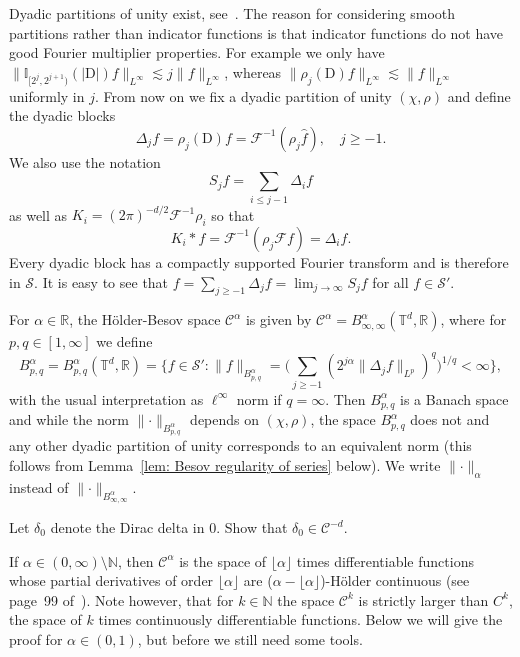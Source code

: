 \documentclass[a4paper,11pt]{article}
\newcommand{\cdummy}{\cdot}
\newcommand{\mathD}{\mathrm{D}}
\newcommand{\CF}{\mathscr{F}}
\newcommand{\CS}{\mathscr{S}}
\newcommand{\CC}{\mathscr{C}}
\begin{document}
Dyadic partitions of unity exist, see~{\cite{Bahouri2011}}. The reason for
considering smooth partitions rather than indicator functions is that
indicator functions do not have good Fourier multiplier properties. For
example we only have $\| \mathbb{I}_{[2^j, 2^{j + 1})} (| \mathD |) f
\|_{L^{\infty}} \lesssim j \| f \|_{L^{\infty}}$, whereas $\| \rho_j (\mathD)
f \|_{L^{\infty}} \lesssim \| f \|_{L^{\infty}}$ uniformly in $j$. From now on
we fix a dyadic partition of unity $(\chi, \rho)$ and define the dyadic blocks
\[ \Delta_j f = \rho_j (\mathD) f = \CF^{- 1} (\rho_j \hat{f}), \hspace{1em}
   j \geqslant - 1. \]
We also use the notation
\[ S_j f = \sum_{i \leqslant j - 1} \Delta_i f \]
as well as $K_i = (2 \pi)^{- d / 2} \CF^{- 1} \rho_i$ so that
\[ K_i \ast f = \CF^{- 1} \left( \rho_j \CF f \right) = \Delta_i f. \]
Every dyadic block has a compactly supported Fourier transform and is
therefore in $\CS$. It is easy to see that $f = \sum_{j \geqslant - 1}
\Delta_j f = \lim_{j \rightarrow \infty} S_j f$ for all $f \in \CS'$.

For $\alpha \in \mathbb{R}$, the H{\"o}lder-Besov space $\CC^{\alpha}$ is
given by $\CC^{\alpha} = B^{\alpha}_{\infty, \infty} (\mathbb{T}^d,
\mathbb{R})$, where for $p, q \in [1, \infty]$ we define
\[
    B^{\alpha}_{p, q} = B^{\alpha}_{p, q} (\mathbb{T}^d, \mathbb{R}) = \Big\{ f \in \CS' : \|f\|_{B^{\alpha}_{p, q}} = \Big( \sum_{j \geqslant - 1} (2^{j \alpha} \| \Delta_j f\|_{L^p})^q \Big)^{1 / q} < \infty \Big\},
\]
with the usual interpretation as $\ell^{\infty}$ norm if $q = \infty$. Then
$B^{\alpha}_{p, q}$ is a Banach space and while the norm $\lVert \cdummy
\rVert_{B^{\alpha}_{p, q}}$ depends on $(\chi, \rho)$, the space
$B^{\alpha}_{p, q}$ does not and any other dyadic partition of unity
corresponds to an equivalent norm (this follows from Lemma~\ref{lem: Besov
regularity of series} below). We write $\lVert \cdummy \rVert_{\alpha}$
instead of $\lVert \cdummy \rVert_{B^{\alpha}_{\infty, \infty}}$.

\begin{exercise}
  Let $\delta_0$ denote the Dirac delta in 0. Show that $\delta_0 \in \CC^{-
  d}$.
\end{exercise}

If $\alpha \in (0, \infty) \setminus \mathbb{N}$, then $\CC^{\alpha}$ is the
space of $\lfloor \alpha \rfloor$ times differentiable functions whose partial
derivatives of order $\lfloor \alpha \rfloor$ are ($\alpha - \lfloor \alpha
\rfloor$)-H{\"o}lder continuous (see page~99 of~{\cite{Bahouri2011}}). Note
however, that for $k \in \mathbb{N}$ the space $\CC^k$ is strictly larger
than $C^k$, the space of $k$ times continuously differentiable functions.
Below we will give the proof for $\alpha \in (0, 1)$, but before we still need
some tools.
\end{document}
